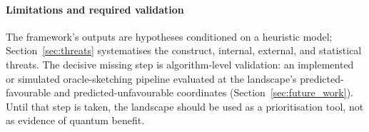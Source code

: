 \documentclass[sensors,article,submit,pdftex,moreauthors]{Definitions/mdpi}
\providecommand{\DIFadd}[1]{{\protect\color{blue}#1}} %
\providecommand{\DIFaddend}{} %
\begin{document}
\paragraph{\DIFadd{Limitations and required validation}} \DIFadd{The framework's outputs are hypotheses conditioned on a heuristic model; Section~\ref{sec:threats} systematises the construct, internal, external, and statistical threats. The decisive missing step is algorithm-level validation: an implemented or simulated oracle-sketching pipeline evaluated at the landscape's predicted-favourable and predicted-unfavourable coordinates (Section~\ref{sec:future_work}). Until that step is taken, the landscape should be used as a prioritisation tool, not as evidence of quantum benefit}\DIFaddend .


\vspace{6pt}




\end{document}
